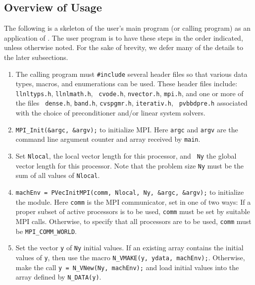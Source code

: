 \subsection{Overview of Usage}
\label{Usage}

The following is a skeleton of the user's main program (or calling
program) as an application of {\codeS}.
The user program is to have these steps in the order indicated, unless 
otherwise noted.
For the sake of brevity, we defer many of the details to the later
subsections.

\begin{enumerate}

\item 
The calling program must {\tt \#include} several header files so that
various data types, macros, and enumerations can be used.
These header files include: {\tt llnltyps.h}, {\tt llnlmath.h}, {\tt
cvode.h}, {\tt nvector.h}, {\tt mpi.h}, and one or more of the files {\tt
dense.h}, {\tt band.h}, {\tt cvspgmr.h}, {\tt iterativ.h}, {\tt
pvbbdpre.h} associated with the choice of preconditioner and/or linear
system solvers.

\item 
{\tt MPI\_Init(\&argc, \&argv);} to initialize MPI.  
Here {\tt argc} and {\tt argv} are the command line argument counter
and array received by {\tt main}.

\item
Set {\tt Nlocal}, the local vector length for this processor, and {\tt
Ny} the global vector length for this processor.
Note that the problem size {\tt Ny} must be the sum of all values of {\tt Nlocal}.

\item 
{\tt machEnv = PVecInitMPI(comm, Nlocal, Ny, \&argc, \&argv);}
to initialize the  module.
Here {\tt comm} is the MPI communicator, set in one of two ways: If a
proper subset of active processors is to be used, {\tt comm} must be
set by suitable MPI calls.
Otherwise, to specify that all processors are to be used, {\tt comm}
must be {\tt MPI\_COMM\_WORLD}.

\item
Set the vector {\tt y} of {\tt Ny} initial values. 
If an existing array contains the initial values of {\tt y}, then use the macro 
{\tt N\_VMAKE(y, ydata, machEnv);}. 
Otherwise, make the call {\tt y = N\_VNew(Ny, machEnv);} and load initial values
into the array defined by {\tt N\_DATA(y)}. 


\end{enumerate}
